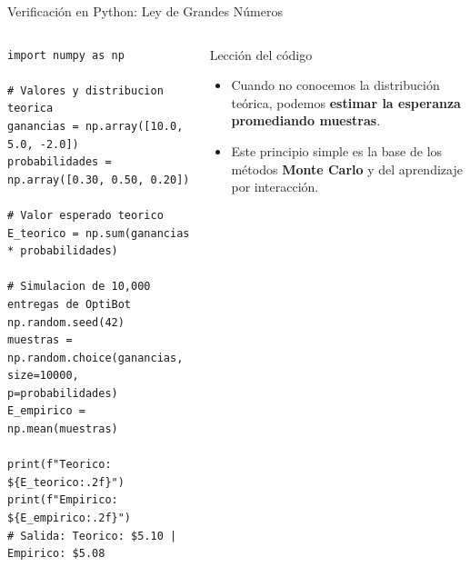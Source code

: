 \begin{frame}[fragile]{Verificación en Python: Ley de Grandes Números}
  \begin{columns}[T,onlytextwidth]
\begin{lstlisting}[style=rlcode]
import numpy as np

# Valores y distribucion teorica
ganancias = np.array([10.0, 5.0, -2.0])
probabilidades = np.array([0.30, 0.50, 0.20])

# Valor esperado teorico
E_teorico = np.sum(ganancias * probabilidades)

# Simulacion de 10,000 entregas de OptiBot
np.random.seed(42)
muestras = np.random.choice(ganancias, size=10000, p=probabilidades)
E_empirico = np.mean(muestras)

print(f"Teorico:  ${E_teorico:.2f}")
print(f"Empirico: ${E_empirico:.2f}")
# Salida: Teorico: $5.10 | Empirico: $5.08
\end{lstlisting}
      \begin{block}{Lección del código}
        \begin{itemize}
          \item Cuando no conocemos la distribución teórica, podemos \textbf{estimar la esperanza promediando muestras}.
          \item Este principio simple es la base de los métodos \textbf{Monte Carlo} y del aprendizaje por interacción.
        \end{itemize}
      \end{block}
  \end{columns}
\end{frame}
